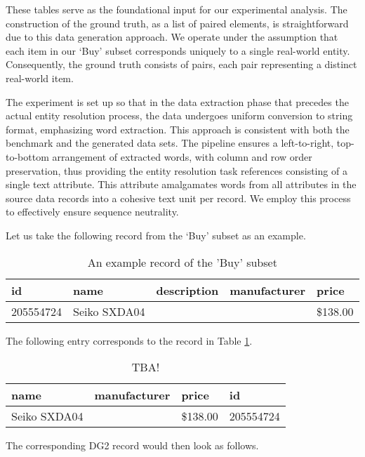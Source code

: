 These tables serve as the foundational input for our experimental analysis.
The construction of the ground truth, as a list of paired elements, is
straightforward due to this data generation approach.
We operate under the assumption that each item in our `Buy' subset
corresponds uniquely to a single real-world entity.
Consequently, the ground truth consists of pairs, each pair representing a
distinct real-world item.

The experiment is set up so that in the data extraction phase that precedes the
actual entity resolution process, the data undergoes uniform conversion to
string format, emphasizing word extraction.
This approach is consistent with both the benchmark and the generated data sets.
The pipeline ensures a left-to-right, top-to-bottom arrangement of extracted
words, with column and row order preservation, thus providing the entity
resolution task references consisting of a single text attribute.
This attribute amalgamates words from all attributes in the source data records
into a cohesive text unit per record.
We employ this process to effectively ensure sequence neutrality.

Let us take the following record from the `Buy' subset as an example.

\begin{table}[ht]
    \setlength\tabcolsep{5pt}
    \begin{tabular}{|l|l|l|l|l|}
        \hline
        id&name&description&manufacturer&price\\
        \hline
        205554724&Seiko SXDA04& & &\$138.00\\
        \hline
    \end{tabular}
    \label{tab:buy-record}
    \caption{An example record of the 'Buy' subset}
\end{table}

The following entry corresponds to the record in Table \ref{tab:buy-record}.

\begin{table}[ht]
    \setlength\tabcolsep{6pt}
    \begin{tabular}{|l|l|l|l|}
        \hline
        name & manufacturer & price & id \\
        \hline
        Seiko SXDA04 & & \$138.00 & 205554724 \\
        \hline
    \end{tabular}
    \label{tab:dg1-record}
    \caption{TBA!}
\end{table}

The corresponding DG2 record would then look as follows.

